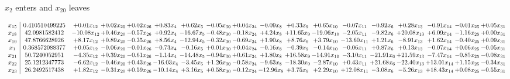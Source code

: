 \documentclass[9pt]{article}
\begin{document}
 $ x_{2} $ enters and $ x_{20} $ leaves 

 \[\begin{array}{c| c c@{\hskip 2pt} c@{\hskip 2pt} c@{\hskip 2pt} c@{\hskip 2pt} c@{\hskip 2pt} c@{\hskip 2pt} c@{\hskip 2pt} c@{\hskip 2pt} c@{\hskip 2pt} c@{\hskip 2pt} c@{\hskip 2pt} c@{\hskip 2pt} c@{\hskip 2pt} c@{\hskip 2pt} c@{\hskip 2pt} c@{\hskip 2pt} }
 x_{15}   &  0.410510499225 & +  0.01 x_{12} & +  0.02 x_{20} & +  0.02 x_{26} & +  0.83 x_{4} & +  0.62 x_{5} & -0.05 x_{30} & +  0.04 x_{24} & -0.09 x_{8} & +  0.33 x_{9} & +  0.65 x_{10} & -0.07 x_{11} & -0.92 x_{6} & +  0.28 x_{13} & -0.91 x_{14} & -0.01 x_{25} & +  0.05 x_{31}\\
 x_{18}   &  42.0981582412 & -10.08 x_{12} & +  0.46 x_{20} & -0.57 x_{26} & +  0.92 x_{4} & -16.67 x_{5} & -0.48 x_{30} & -0.18 x_{24} & +  4.24 x_{8} & + 11.65 x_{9} & -19.06 x_{10} & -2.05 x_{11} & -9.82 x_{6} & + 20.08 x_{13} & +  6.09 x_{14} & -1.16 x_{25} & +  0.00 x_{31}\\
 x_{19}   &  47.8766628926 & +  8.17 x_{12} & +  0.89 x_{20} & -0.35 x_{26} & +  8.56 x_{4} & -12.94 x_{5} & -0.32 x_{30} & -0.69 x_{24} & +  1.90 x_{8} & +  8.76 x_{9} & +  3.79 x_{10} & -13.60 x_{11} & +  1.21 x_{6} & -8.91 x_{13} & +  1.62 x_{14} & -0.40 x_{25} & +  0.09 x_{31}\\
 x_{1}   &  0.368572088377 & +  0.05 x_{12} & -0.06 x_{20} & -0.01 x_{26} & -0.73 x_{4} & -0.16 x_{5} & +  0.01 x_{30} & +  0.04 x_{24} & -0.16 x_{8} & -0.39 x_{9} & -0.14 x_{10} & -0.06 x_{11} & +  0.87 x_{6} & +  0.13 x_{13} & -0.07 x_{14} & +  0.06 x_{25} & -0.05 x_{31}\\
 x_{21}   &  50.7240052951 & -4.35 x_{12} & +  0.39 x_{20} & -0.61 x_{26} & -1.14 x_{4} & -14.48 x_{5} & -0.94 x_{30} & +  0.61 x_{24} & +  1.80 x_{8} & + 16.58 x_{9} & -14.91 x_{10} & -3.10 x_{11} & -21.91 x_{6} & + 21.59 x_{13} & -7.47 x_{14} & -0.85 x_{25} & -0.08 x_{31}\\
 x_{22}   &  25.1212347773 & -6.62 x_{12} & -0.46 x_{20} & +  0.43 x_{26} & -16.03 x_{4} & -3.45 x_{5} & +  1.26 x_{30} & -0.58 x_{24} & -9.63 x_{8} & -18.30 x_{9} & -2.87 x_{10} & +  0.43 x_{11} & + 21.68 x_{6} & -22.40 x_{13} & + 13.01 x_{14} & +  1.15 x_{25} & -0.34 x_{31}\\
 x_{23}   &  26.2492517438 & +  1.82 x_{12} & -0.31 x_{20} & +  0.59 x_{26} & -10.14 x_{4} & +  3.16 x_{5} & +  0.58 x_{30} & -0.12 x_{24} & -12.96 x_{8} & +  3.75 x_{9} & +  2.29 x_{10} & + 12.08 x_{11} & -3.08 x_{6} & -5.26 x_{13} & + 18.43 x_{14} & +  0.08 x_{25} & -0.55 x_{31}\\

\end{array}\]
\end{document}
